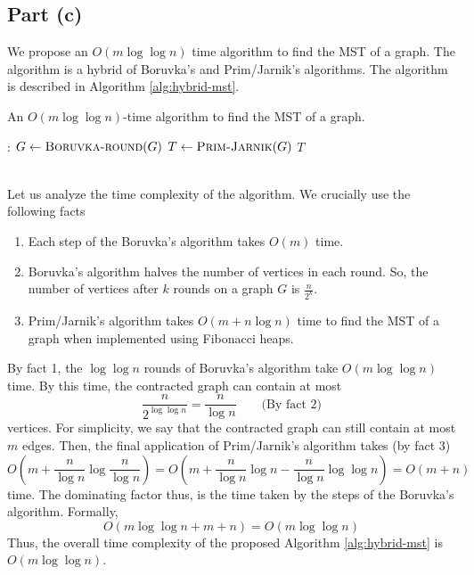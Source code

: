 \documentclass[9pt]{article}
\begin{document}
\subsection*{Part (c)}
We propose an $O(m \log{\log{n}})$ time algorithm to find the MST of a graph. The algorithm
is a hybrid of Boruvka's and Prim/Jarnik's algorithms. The algorithm is described in
Algorithm \ref{alg:hybrid-mst}.
\begin{algorithm}
    \caption{An $O(m \log{\log{n}})$-time algorithm to find the MST of a graph.}
    \label{alg:hybrid-mst}
    \begin{algorithmic}[1]
        :
                \State $G \gets \Call{Boruvka-round}{G}$ 
            \EndFor
            \State $T \gets \Call{Prim-Jarnik}{G}$
            \State \Return $T$
        \EndProcedure
    \end{algorithmic}
\end{algorithm}
\vspace*{0pt} \\
Let us analyze the time complexity of the algorithm. We crucially use the following facts
\begin{enumerate}
    \item Each step of the Boruvka's algorithm takes $O(m)$ time.
    \item Boruvka's algorithm halves the number of vertices in each round. So, the number
    of vertices after $k$ rounds on a graph $G$ is $\frac{n}{2^{k}}$.
    \item Prim/Jarnik's algorithm takes $O(m + n \log{n})$ time to find the MST of a graph
    when implemented using Fibonacci heaps.
\end{enumerate}
By fact 1, the $\log{\log{n}}$ rounds of Boruvka's algorithm take $O(m \log{\log{n}})$ time.
By this time, the contracted graph can contain at most
\begin{equation}
    \label{eq:vertices-contracted}
    \frac{n}{2^{\log{\log{n}}}} = \frac{n}{\log{n}} \qquad \text{(By fact 2)}
\end{equation}
vertices. For simplicity, we say that the contracted graph can still contain at most $m$ edges.
Then, the final application of Prim/Jarnik's algorithm takes (by fact 3)
\begin{equation}
    \label{eq:prim-jarnik-time}
    O\left( m + \frac{n}{\log{n}} \log{\frac{n}{\log{n}}} \right)
    = O\left(m + \frac{n}{\log{n}} \log{n} - \frac{n}{\log{n}} \log{\log{n}}\right)
    = O(m + n)
\end{equation}
time. The dominating factor thus, is the time taken by the steps of the Boruvka's algorithm.
Formally,
\begin{equation}
    \label{eq:time-complexity}
    O(m \log{\log{n}} + m + n) = O(m \log{\log{n}})
\end{equation}
Thus, the overall time complexity of the proposed Algorithm \ref{alg:hybrid-mst} is
$O(m \log{\log{n}})$.
\end{document}
